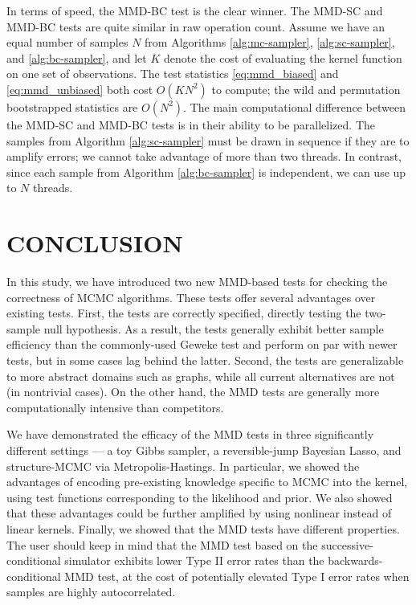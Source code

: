 \documentclass[a4paper,12pt]{article}
\begin{document}
In terms of speed, the MMD-BC test is the clear winner. The MMD-SC and MMD-BC tests are quite similar in raw operation count. Assume we have an equal number of samples $N$ from Algorithms \ref{alg:mc-sampler}, \ref{alg:sc-sampler}, and \ref{alg:bc-sampler}, and let $K$ denote the cost of evaluating the kernel function on one set of observations. The test statistics \eqref{eq:mmd_biased} and \eqref{eq:mmd_unbiased} both cost $O(KN^{2})$ to compute; the wild and permutation bootstrapped statistics are $O(N^{2})$. The main computational difference between the MMD-SC and MMD-BC tests is in their ability to be parallelized. The samples from Algorithm \ref{alg:sc-sampler} must be drawn in sequence if they are to amplify errors; we cannot take advantage of more than two threads. In contrast, since each sample from Algorithm \ref{alg:bc-sampler} is independent, we can use up to $N$ threads.

\section{CONCLUSION}

In this study, we have introduced two new MMD-based tests for checking the correctness of MCMC algorithms. These tests offer several advantages over existing tests. First, the tests are correctly specified, directly testing the two-sample null hypothesis. As a result, the tests generally exhibit better sample efficiency than the commonly-used Geweke test and perform on par with newer tests, but in some cases lag behind the latter. Second, the tests are generalizable to more abstract domains such as graphs, while all current alternatives are not (in nontrivial cases). On the other hand, the MMD tests are generally more computationally intensive than competitors.

We have demonstrated the efficacy of the MMD tests in three significantly different settings --- a toy Gibbs sampler, a reversible-jump Bayesian Lasso, and structure-MCMC via Metropolis-Hastings. In particular, we showed the advantages of encoding pre-existing knowledge specific to MCMC into the kernel, using test functions corresponding to the likelihood and prior. We also showed that these advantages could be further amplified by using nonlinear instead of linear kernels. Finally, we showed that the MMD tests have different properties. The user should keep in mind that the MMD test based on the successive-conditional simulator exhibits lower Type II error rates than the backwards-conditional MMD test, at the cost of potentially elevated Type I error rates when samples are highly autocorrelated.
\end{document}
